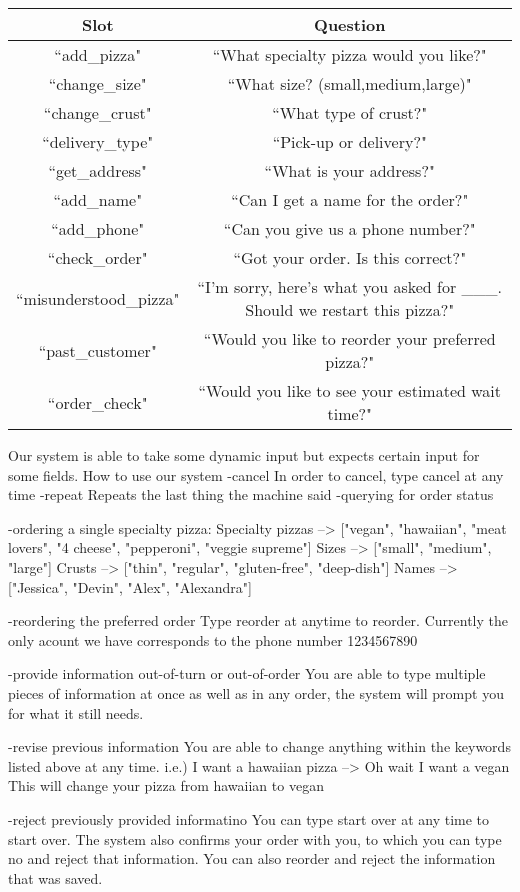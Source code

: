 \documentclass{article}
\begin{document}
\begin{tabular}{|c|c|}
\hline
Slot & Question \\\hline
``add\_pizza" & ``What specialty pizza would you like?"\\\hline
``change\_size" & ``What size? (small,medium,large)"\\\hline
``change\_crust" & ``What type of crust?"\\\hline
``delivery\_type" & ``Pick-up or delivery?"\\\hline
``get\_address" & ``What is your address?"\\\hline
``add\_name" & ``Can I get a name for the order?"\\\hline
``add\_phone" & ``Can you give us a phone number?"\\\hline
``check\_order" & ``Got your order. Is this correct?"\\\hline
``misunderstood\_pizza" & ``I'm sorry, here's what you asked for \_\_\_. Should we restart this pizza?"\\\hline
``past\_customer" & ``Would you like to reorder your preferred pizza?"\\\hline
``order\_check" & ``Would you like to see your estimated wait time?"\\\hline
\end{tabular}

Our system is able to take some dynamic input but expects certain input for some fields.
How to use our system\:
-cancel
In order to cancel, type cancel at any time
-repeat
Repeats the last thing the machine said
-querying for order status

-ordering a single specialty pizza:
Specialty pizzas --> ["vegan", "hawaiian", "meat lovers", "4 cheese", "pepperoni", "veggie supreme"]
Sizes --> ["small", "medium", "large"]
Crusts --> ["thin", "regular", "gluten-free", "deep-dish"]
Names --> ["Jessica", "Devin", "Alex", "Alexandra"]

-reordering the preferred order
Type reorder at anytime to reorder. Currently the only acount we have corresponds to the phone number 1234567890

-provide information out-of-turn or out-of-order
You are able to type multiple pieces of information at once as well as in any order, the system will prompt you for what it still needs.

-revise previous information
You are able to change anything within the keywords listed above at any time.
i.e.) I want a hawaiian pizza --> Oh wait I want a vegan
This will change your pizza from hawaiian to vegan

-reject previously provided informatino
You can type start over at any time to start over.
The system also confirms your order with you, to which you can type no and reject that information.
You can also reorder and reject the information that was saved.
\end{document}
